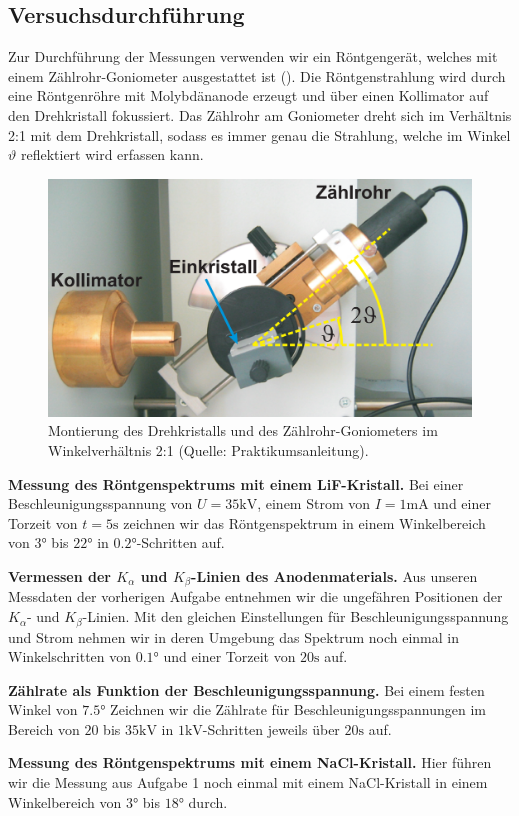 \subsection{Versuchsdurchführung}

Zur Durchführung der Messungen verwenden wir ein Röntgengerät, welches mit einem Zählrohr-Goniometer ausgestattet ist (). Die Röntgenstrahlung wird durch eine Röntgenröhre mit Molybdänanode erzeugt und über einen Kollimator auf den Drehkristall fokussiert. Das Zählrohr am Goniometer dreht sich im Verhältnis 2:1 mit dem Drehkristall, sodass es immer genau die Strahlung, welche im Winkel $\vartheta$ reflektiert wird erfassen kann.

\begin{figure}[H]
  \centering
  \includegraphics[width=.8\textwidth]{files/goniometer.png}
  \caption{Montierung des Drehkristalls und des Zählrohr-Goniometers im Winkelverhältnis 2:1 (Quelle: Praktikumsanleitung).}
  \label{fig:goniometer}
\end{figure}

\textbf{Messung des Röntgenspektrums mit einem LiF-Kristall.} Bei einer Beschleunigungsspannung von $U = 35 \si{\kilo\volt}$, einem Strom von $I = 1\si{\milli\ampere}$ und einer Torzeit von $t = 5\si{\second}$ zeichnen wir das Röntgenspektrum in einem Winkelbereich von $3\si{\degree}$ bis $22\si{\degree}$ in $0.2\si{\degree}$-Schritten auf.

\textbf{Vermessen der $K_{\alpha}$ und $K_{\beta}$-Linien des Anodenmaterials.} Aus unseren Messdaten der vorherigen Aufgabe entnehmen wir die ungefähren Positionen der $K_{\alpha}$- und $K_{\beta}$-Linien. Mit den gleichen Einstellungen für Beschleunigungsspannung und Strom nehmen wir in deren Umgebung das Spektrum noch einmal in Winkelschritten von $0.1\si{\degree}$ und einer Torzeit von $20 \si{\second}$ auf.

\textbf{Zählrate als Funktion der Beschleunigungsspannung.} Bei einem festen Winkel von $7.5\si{\degree}$ Zeichnen wir die Zählrate für Beschleunigungsspannungen im Bereich von $20$ bis $35\si{\kilo\volt}$ in $1\si{\kilo\volt}$-Schritten jeweils über $20\si{\second}$ auf.

\textbf{Messung des Röntgenspektrums mit einem NaCl-Kristall.} Hier führen wir die Messung aus Aufgabe 1 noch einmal mit einem NaCl-Kristall in einem Winkelbereich von $3\si{\degree}$ bis $18\si{\degree}$ durch.